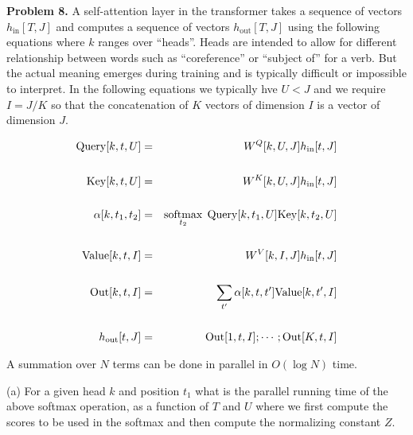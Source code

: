\documentclass{article}
\newcommand{\solution}[1]{}
\begin{document}
\solution{We are guaranteed to eventually repeat a bigram (a pair of words).  At zero temperature the generation is deterministic
  and hence when a pair of words is repeated we must then see exactly the sequence following the first occurance of that bigram and the generation enters a deterministic loop.
  This happens in practice with many transformer models when sampling at low temperatures.}

\bigskip
{\bf Problem 8.} A self-attention layer in the transformer takes a sequence of vectors $h_\mathrm{in}[T,J]$ and computes
a sequence of vectors $h_\mathrm{out}[T,J]$ using the following equations where $k$ ranges over ``heads''. Heads are intended to allow for
different relationship between words such as ``coreference'' or ``subject of'' for a verb. But the actual meaning emerges during training
and is typically difficult or impossible to interpret.  In the following equations we typically hve $U < J$ and we require $I = J/K$
so that the concatenation of $K$ vectors of dimension $I$ is a vector of dimension $J$.

\begin{eqnarray*}
\mathrm{Query}[k,t,U] & = & W^Q[k,U,J]h_\mathrm{in}[t,J] \\
\\
\mathrm{Key}[k,t,U] & = &  W^K[k,U,J]h_\mathrm{in}[t,J] \\
\\
\alpha[k,t_1,t_2] & = & \operatorname*{softmax}_{t_2}\; \mathrm{Query}[k,t_1,U]\mathrm{Key}[k,t_2,U]\\
\\
\mathrm{Value}[k,t,I] & = & W^V[k,I,J]h_\mathrm{in}[t,J] \\
\\
\mathrm{Out}[k,t,I] & = & \sum_{t'}\alpha[k,t,t']\mathrm{Value}[k,t',I] \\
\\
h_\mathrm{out}[t,J] & = & \mathrm{Out}[1,t,I];\cdots;\mathrm{Out}[K,t,I]
\end{eqnarray*}

A summation over $N$ terms can be done in parallel in $O(\log N)$ time.

\medskip
(a) For a given head $k$ and position $t_1$ what is the parallel running time of the above softmax operation, as a function of $T$ and $U$
where we first compute the scores to be used in the softmax and then compute the normalizing constant $Z$.

\solution{
  The scores can be computed in parallel in $\ln U$ time and then $Z$ can be computed in $\ln T$ time.  We then get $O(\ln T + \ln U)$.
  In practice the inner product used in computing the scores would be done in $O(U)$ time giving $O(U + \ln T)$.
}
\end{document}
